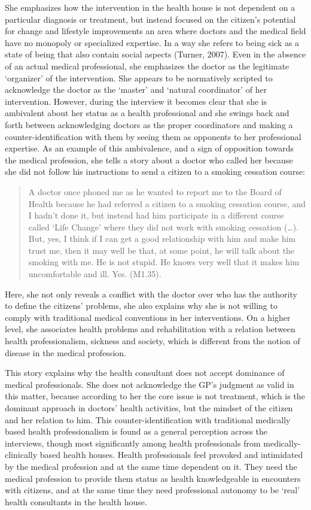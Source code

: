 She emphasizes how the intervention in the health house is not dependent on a particular diagnosis or treatment, but instead focused on the citizen’s potential for change and lifestyle improvements an area where doctors and the medical field have no monopoly or specialized expertise. In a way she refers to being sick as a state of being that also contain social aspects (Turner, 2007). Even in the absence of an actual medical professional, she emphasizes the doctor as the legitimate ‘organizer’ of the intervention. She appears to be normatively scripted to acknowledge the doctor as the ‘master’ and ‘natural coordinator’ of her intervention. However, during the interview it becomes clear that she is ambivalent about her status as a health professional and she swings back and forth between acknowledging doctors as the proper coordinators and making a counter-identification with them by seeing them as opponents to her professional expertise. As an example of this ambivalence, and a sign of opposition towards the medical profession, she tells a story about a doctor who called her because she did not follow his instructions to send a citizen to a smoking cessation course:
    \blockquote{A doctor once phoned me as he wanted to report me to the Board of Health because he had referred a citizen to a smoking cessation course, and I hadn’t done it, but instead had him participate in a different course called ‘Life Change’ where they did not work with smoking cessation (…). But, yes, I think if I can get a good relationship with him and make him trust me, then it may well be that, at some point, he will talk about the smoking with me. He is not stupid. He knows very well that it makes him uncomfortable and ill. Yes. (M1.35).}
Here, she not only reveals a conflict with the doctor over who has the authority to define the citizens’ problems, she also explains why she is not willing to comply with traditional medical conventions in her interventions. On a higher level, she associates health problems and rehabilitation with a relation between health professionalism, sickness and society, which is different from the notion of disease in the medical profession.
\par
This story explains why the health consultant does not accept dominance of medical professionals. She does not acknowledge the GP’s judgment as valid in this matter, because according to her the core issue is not treatment, which is the dominant approach in doctors’ health activities, but the mindset of the citizen and her relation to him. This counter-identification with traditional medically based health professionalism is found as a general perception across the interviews, though most significantly among health professionals from medically-clinically based health houses. Health professionals feel provoked and intimidated by the medical profession and at the same time dependent on it. They need the medical profession to provide them status as health knowledgeable in encounters with citizens, and at the same time they need professional autonomy to be ‘real’ health consultants in the health house.

